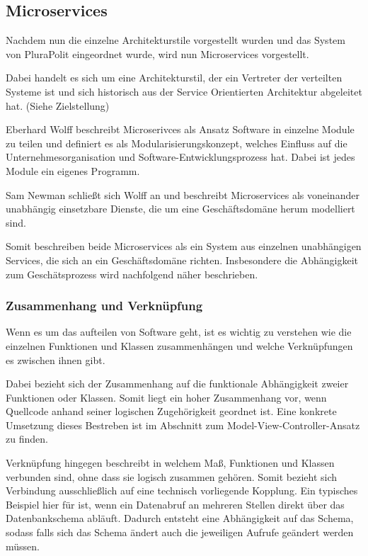 \subsection{Microservices}

Nachdem nun die einzelne Architekturstile vorgestellt wurden und das System von PluraPolit eingeordnet wurde, wird nun Microservices vorgestellt.

Dabei handelt es sich um eine Architekturstil, der ein Vertreter der verteilten Systeme ist und sich historisch aus der Service Orientierten Architektur abgeleitet hat. (Siehe Zielstellung)

Eberhard Wolff beschreibt Microserivces als Ansatz Software in einzelne Module zu teilen und definiert es als Modularisierungskonzept, welches Einfluss auf die Unternehmesorganisation und Software-Entwicklungsprozess hat. Dabei ist jedes Module ein eigenes Programm.

Sam Newman schließt sich Wolff an und beschreibt Microservices als voneinander unabhängig einsetzbare Dienste, die um eine Geschäftsdomäne herum modelliert sind.

Somit beschreiben beide Microservices als ein System aus einzelnen unabhängigen Services, die sich an ein Geschäftsdomäne richten. Insbesondere die Abhängigkeit zum Geschätsprozess wird nachfolgend näher beschrieben.


\subsubsection{Zusammenhang und Verknüpfung}

Wenn es um das aufteilen von Software geht, ist es wichtig zu verstehen wie die einzelnen Funktionen und Klassen zusammenhängen und welche Verknüpfungen es zwischen ihnen gibt.

Dabei bezieht sich der Zusammenhang auf die funktionale Abhängigkeit zweier Funktionen oder Klassen. Somit liegt ein hoher Zusammenhang vor, wenn Quellcode anhand seiner logischen Zugehörigkeit geordnet ist. Eine konkrete Umsetzung dieses Bestreben ist im Abschnitt zum Model-View-Controller-Ansatz zu finden.

Verknüpfung hingegen beschreibt in welchem Maß, Funktionen und Klassen verbunden sind, ohne dass sie logisch zusammen gehören. Somit bezieht sich Verbindung ausschließlich auf eine technisch vorliegende Kopplung. Ein typisches Beispiel hier für ist, wenn ein Datenabruf an mehreren Stellen direkt über das Datenbankschema abläuft. Dadurch entsteht eine Abhängigkeit auf das Schema, sodass falls sich das Schema ändert auch die jeweiligen Aufrufe geändert werden müssen.

